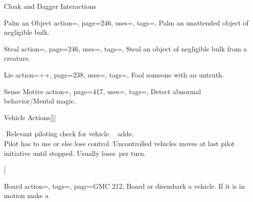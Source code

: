 \begin{PageBack}
\begin{Tables}{\backTableHeight}
\begin{Table}{Cloak and Dagger Interactions}
\begin{entry}{Palm an Object}{%
                action=,
                page=246,
                uses=\Thievery,
                tags=\Manipulate,
            }
                Palm an unattended object of negligible bulk.\hfill
            \end{entry}
            \begin{entry}{Steal}{%
                action=,
                page=246,
                uses=\Thievery,
                tags=\Manipulate,
            }
                Steal an object of negligible bulk from a creature.\hfill
            \end{entry}
            \breakLine
            \begin{entry}{Lie}{%
                action=++,
                page=238,
                uses={\Deception[tags={S}]},
                tags=\Mental\Concentrate,
            }
                Fool someone with an untruth. \Auditory\,\Linguistic \hfill
            \end{entry}
            \begin{entry}{Sense Motive}{%
                action=,
                page=417,
                uses={\Perception[tags={S}]},
                tags=\Concentrate,
            }
                Detect abnormal behavior/Mental magic. \hfill
                \;
            \end{entry}
        \end{Table}
        \TableSpace
        \begin{Table}{Vehicle Actions}[][%
            \begin{minipage}[b]{0.755\linewidth}%
                \Piloting\,\dash\,Relevant piloting check for vehicle. \hfill
                \Reck \,\dash\,  adds:
                \textbf{}\\
                Pilot has to use  or  else lose control.\hfill
                Uncontrolled vehicles moves at last pilot initiative until stopped.
                Usually loses \,\Feet per turn.%
            \end{minipage}%
        ]
            \begin{entry}{Board}{%
                action=,
                tags=\Move,
                page=GMC 212,
            }
                Board or disembark a vehicle. \hfill
                If it is in motion make a

\end{entry}
\end{Table}
\end{Tables}
\end{PageBack}
